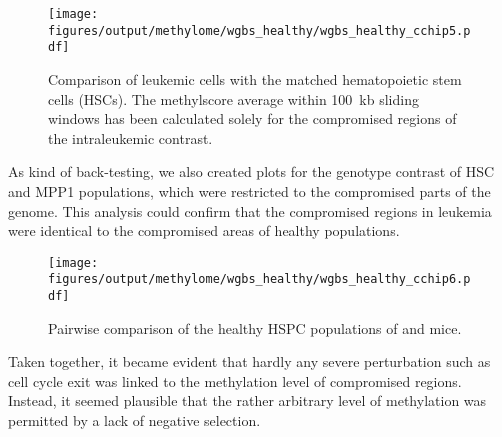 \begin{figure}[!ht] 
	\centering
	\texttt{[image: figures/output/methylome/wgbs\_healthy/wgbs\_healthy\_cchip5.pdf]} 
	\caption{Comparison of \mllafnine leukemic cells with the matched hematopoietic stem cells (HSCs). The methylscore average within \SI{100}{\kilo b} sliding windows has been calculated solely for the compromised regions of the intraleukemic contrast.}
	\label{fig:wgbs_healthy_cchip5}
\end{figure}

As kind of back-testing, we also created plots for the genotype contrast of HSC and MPP1 populations, which were restricted to the compromised parts of the genome. This analysis could confirm that the compromised regions in leukemia were identical to the compromised areas of healthy populations.

\begin{figure}[!ht] 
	\centering
	\texttt{[image: figures/output/methylome/wgbs\_healthy/wgbs\_healthy\_cchip6.pdf]} 
	\caption{Pairwise comparison of the healthy HSPC populations of \dnmtchip and \dnmtwt mice.}
	\label{fig:wgbs_healthy_cchip6}
\end{figure}

Taken together, it became evident that hardly any severe perturbation such as cell cycle exit was linked to the methylation level of compromised regions. Instead, it seemed plausible that the rather arbitrary level of methylation was permitted by a lack of negative selection.